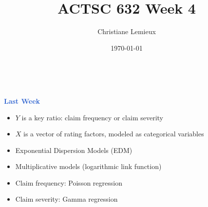 \documentclass[aspectratio=169,professionalfonts,mathserif]{beamer}
\title{ACTSC 632 Week 4}
\author{Christiane Lemieux}
\date{\today}
\newcommand{\highlight}[1]{\textcolor{Highlight}{\bf #1}}
\renewcommand{\(}{\left(}
\renewcommand{\)}{\right)}
\renewcommand{\[}{\left[}
\renewcommand{\]}{\right]}
\newcommand{\mytitle}[1]{\vspace*{-1mm}%
  \centerline{\highlight{\Large #1}}\vspace*{3mm}}
\newenvironment{slidebox}{%
  \begin{minipage}[c][7.5cm][t]{14.4cm}\raggedright}{%
  \end{minipage}}
\begin{document}

\begin{frame}
  \begin{slidebox}
    
    \vspace{7mm}
    \begin{center}
    \end{center}
    
    \vspace{6mm}
    
    \begin{center}
      \onslide<1>{%
      \highlight{\large Data Science with Actuarial Applications}\\[3mm]}
       \\[6mm]
    \end{center}
    
\end{slidebox}\end{frame}

\begin{frame}\begin{slidebox}
\mytitle{Last Week}

\begin{itemize}
    \item $Y$ is a key ratio: claim frequency or claim severity
    \pause
    \item $X$ is a vector of rating factors, modeled as categorical variables 
    \pause
    \item Exponential Dispersion Models (EDM)
    \pause
    \item Multiplicative models (logarithmic link function)
    \pause
    \item Claim frequency: Poisson regression
    \pause
    \item Claim severity: Gamma regression
\end{itemize}
\end{slidebox}\end{frame}
\end{document}
